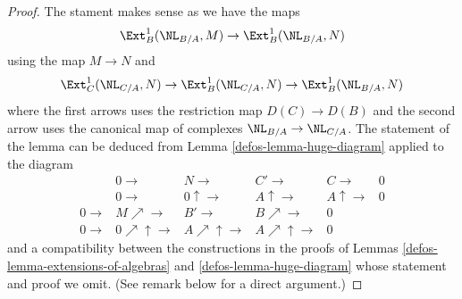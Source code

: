 \begin{proof}

The stament makes sense as we have the maps
$$
\Ext^1_B(\NL_{B/A}, M) \to \Ext^1_B(\NL_{B/A}, N)
$$
using the map $M \to N$ and
$$
\Ext^1_C(\NL_{C/A}, N) \to \Ext^1_B(\NL_{C/A}, N) \to \Ext^1_B(\NL_{B/A}, N)
$$
where the first arrows uses the restriction map $D(C) \to D(B)$
and the second arrow uses the canonical map of complexes
$\NL_{B/A} \to \NL_{C/A}$. The statement of the lemma can be deduced from
Lemma \ref{defos-lemma-huge-diagram} applied to the diagram
$$
\begin{array}{cccccc} & 0 \longrightarrow & N \longrightarrow & C' \longrightarrow & C \longrightarrow & 0 \\  & 0 \longrightarrow & 0 \uparrow\longrightarrow & A \uparrow\longrightarrow & A \uparrow\longrightarrow & 0 \\ 0 \longrightarrow & M \nearrow\longrightarrow & B' \longrightarrow & B \nearrow\longrightarrow & 0 &  \\ 0 \longrightarrow & 0 \nearrow\uparrow\longrightarrow & A \nearrow\uparrow\longrightarrow & A \nearrow\uparrow\longrightarrow & 0 & \end{array}
$$
and a compatibility between the constructions in the proofs
of Lemmas \ref{defos-lemma-extensions-of-algebras} and \ref{defos-lemma-huge-diagram}
whose statement and proof we omit. (See remark below for a direct argument.)
\end{proof}

